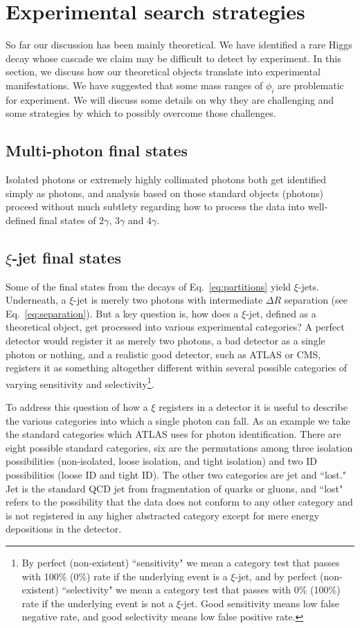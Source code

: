 \documentclass[letter,12pt]{article}
\begin{document}
\section{Experimental search strategies}
So far our discussion has been mainly theoretical. We have identified a rare Higgs decay whose cascade we claim may be difficult to detect by experiment. In this section, we discuss how our theoretical objects translate into experimental manifestations. We have suggested that some mass ranges of $\phi_i$ are problematic for experiment. We will discuss some details on why they are challenging and some strategies by which to possibly overcome those challenges. 

\subsection{Multi-photon final states}

Isolated photons or extremely  highly collimated photons both get identified simply as photons, and analysis based on those  standard objects (photons) proceed without much subtlety regarding how to process the data into well-defined final states of $2\gamma$, $3\gamma$ and $4\gamma$. 

\subsection{$\xi$-jet final states}

Some of the final states from the decays of Eq.~\ref{eq:partitions} yield $\xi$-jets. Underneath, a $\xi$-jet is merely two photons with intermediate $\Delta R$ separation (see Eq.~\ref{eq:separation}). But a key question is, how does a $\xi$-jet, defined as a theoretical object, get processed into various experimental categories? A perfect detector would register it as merely two photons, a bad detector as a single photon or nothing, and a realistic good detector, such as ATLAS or CMS, registers it as something altogether different within several possible categories of varying sensitivity and selectivity\footnote{By perfect (non-existent) ``sensitivity" we mean a category test that passes with 100\% (0\%) rate if the underlying event is a $\xi$-jet, and by perfect (non-existent) ``selectivity"  we mean a category test that passes with 0\% (100\%) rate if the underlying event is not a $\xi$-jet. Good sensitivity means low false negative rate, and good selectivity means low false positive rate.}.

To address this question of how a $\xi$ registers in a detector it is useful to describe the various categories into which a single photon can fall. As an example we take the standard categories which ATLAS uses for photon identification. There are eight possible standard categories, six are the permutations among three isolation possibilities (non-isolated, loose isolation, and tight isolation) and two ID possibilities (loose ID and tight ID). The other two categories are jet and ``lost." Jet is the standard QCD jet from fragmentation of quarks or gluons, and ``lost" refers to the possibility that the data does not conform to any other category and is not registered in any higher abstracted category except for mere energy depositions in the detector. 
\end{document}
